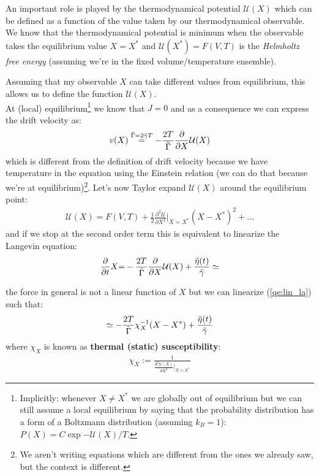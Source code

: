 \documentclass[\main/main.tex]{subfiles}
\begin{document}
An important role is played by the thermodynamical potential $\mathcal{U}(X)$ which can be defined as a function of the value taken by our thermodynamical observable. We know that the thermodynamical potential is minimum when the observable takes the equilibrium value $X=X^*$ and $\mathcal{U}(X^*)=F(V,T)$ is the \textit{Helmholtz free energy} (assuming we're in the fixed volume/temperature ensemble).

Assuming that my observable $X$ can take different values from equilibrium, this allows us to define the function $\mathcal{U}(X)$. \\

At (local) equilibrium\footnote{Implicitly: whenever $X\neq X^*$ we are globally out of equilibrium but we can still assume a local equilibrium by saying that the probability distribution has a form of a Boltzmann distribution (assuming $k_B=1$): $P(X)=C\exp{-\mathcal{U}(X)/T}$.} we know that $J=0$ and as a consequence we can express the drift velocity as:
\begin{equation}
    v(X)\overset{\Tilde{\Gamma}=2\Tilde{\gamma}T}{=}-\frac{2 T}{\Tilde{\Gamma}}\frac{\partial}{\partial X}\mathcal{U}(X)
\end{equation}
which is different from the definition of drift velocity because we have temperature in the equation using the Einstein relation (we can do that because we're at equilibrium)\footnote{We aren't writing equations which are different from the ones we already saw, but the context is different.}. 
Let's now Taylor expand $\mathcal{U}(X)$ around the equilibrium point:
\begin{align}
    \mathcal{U}(X)=F(V,T)+\frac{1}{2}\frac{\partial^2\mathcal{U}}{\partial X^2}\Big\rvert_{X=X^*} (X-X^*)^2+\dots
\end{align}
and if we stop at the second order term this is equivalent to linearize the Langevin equation:
\begin{align}
    \frac{\partial}{\partial t}X{=}-\frac{2 T}{\Tilde{\Gamma}}\frac{\partial}{\partial X}\mathcal{U}(X)+\frac{\Tilde{\eta}(t)}{\Tilde{\gamma}}\simeq
    \label{qe:lin_la}
\end{align}

the force in general is not a linear function of $X$ but we can linearize (\ref{qe:lin_la}) such that:
\begin{equation}
   \simeq -\frac{2T}{\Tilde{\Gamma}}\chi_{X}^{-1}(X-X^*)+ \frac{\Tilde{\eta}(t)}{\Tilde{\gamma}}
\end{equation}
where $\chi_{X}$ is known as \textbf{thermal (static) susceptibility}:
\begin{align}
   \chi_{{X}}:=\frac{1}{\frac{d^2\mathcal{U}(X)}{dX^2}|_{X=X^*}} 
\end{align}
\end{document}
